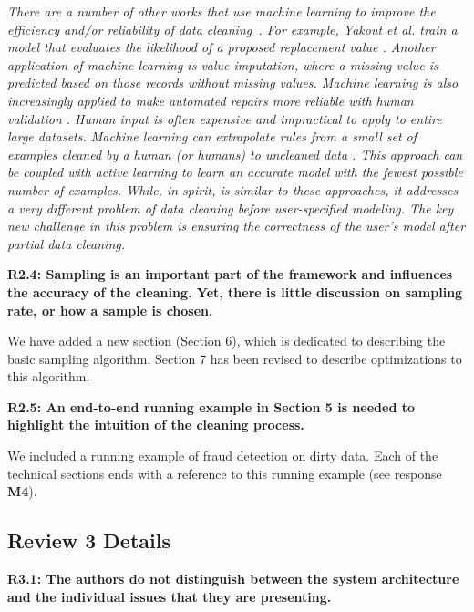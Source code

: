 \emph{There are a number of other works that use machine learning to improve the efficiency and/or reliability of data cleaning~\cite{DBLP:journals/pvldb/YakoutENOI11,yakout2013don,gokhale2014corleone}.
For example, Yakout et al. train a model that evaluates the likelihood of a proposed replacement value \cite{yakout2013don}.
Another application of machine learning is value imputation, where a missing value is predicted based on those records without missing values.
Machine learning is also increasingly applied to make automated repairs more reliable with human validation \cite{DBLP:journals/pvldb/YakoutENOI11}.
Human input is often expensive and impractical to apply to entire large datasets.
Machine learning can extrapolate rules from a small set of examples cleaned by a human (or humans) to uncleaned data \cite{gokhale2014corleone, DBLP:journals/pvldb/YakoutENOI11}.
This approach can be coupled with active learning \cite{DBLP:journals/pvldb/MozafariSFJM14} to learn an accurate model with the fewest possible number of examples.
While, in spirit, \sys is similar to these approaches, it addresses a very different problem of data cleaning before user-specified modeling.
The key new challenge in this problem is ensuring the correctness of the user's model after partial data cleaning.}

\textbf{R2.4: Sampling is an important part of the framework and influences the accuracy of the cleaning. Yet, there is little discussion on sampling rate, or how a sample is chosen.}

We have added a new section (Section 6), which is dedicated to describing the basic sampling algorithm.
Section 7 has been revised to describe optimizations to this algorithm.

\vspace{0.5em}

\textbf{R2.5: An end-to-end running example in Section 5 is needed to highlight the intuition of the cleaning process.}

We included a running example of fraud detection on dirty data. Each of the technical sections ends with a reference to this running example (see response \textbf{M4}).


\vspace{0.5em}


\subsection*{Review 3 Details}
\noindent\textbf{R3.1: The authors do not distinguish between the system architecture and the individual issues that they are presenting.}


